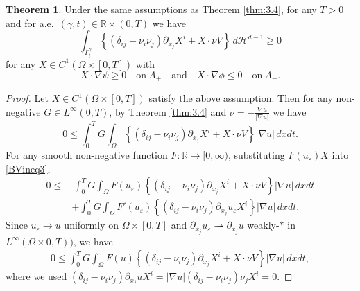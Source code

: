 \documentclass{amsart}
\theoremstyle{definition}
\newtheorem{theorem}[definition]{Theorem}
\def\R{{\mathbb{R}}}
\begin{document}
\begin{theorem}
Under the same assumptions as Theorem \ref{thm:3.4}, for any $T>0$ and for a.e.\ $(\gamma ,t) \in \R \times (0,T)$ we have 
\begin{equation}\label{BVineq2}
\int_{\Gamma _t ^\gamma}
\left\{
\left( \delta_{ij} - \nu_i \nu_j \right)
\partial_{x_j} X^i +
X \cdot \nu V 
\right\} \, d \mathcal{H}^{d-1}
\geq 0
\end{equation}
for any $X \in C^1 (\Omega \times [0,T])$ with
\[
X\cdot \nabla \psi \geq 0 \quad \text{on} \ A_+
\quad
\text{and}
\quad
X \cdot \nabla \phi \leq 0 \quad \text{on} \ A_-.
\]
\end{theorem}
\begin{proof}
Let $X \in C^1 (\Omega \times [0,T])$ 
satisfy the above assumption. 
Then for any non-negative $G \in L^\infty (0,T)$, 
by Theorem \ref{thm:3.4} 
and
$\nu= - \frac{\nabla u}{|\nabla u|}$ 
we have
\begin{equation}\label{BVineq3}
0\leq 
\int_0 ^T G
\int_{\Omega} \left\{ \left( \delta_{ij} - \nu_i \nu_j \right)
\partial_{x_j} X^i 
+ X \cdot \nu V
\right\} |\nabla u| \, dxdt.
\end{equation}
For any smooth non-negative function $F :\R\to [0,\infty)$, 
substituting $F (u_\varepsilon) X$ into \eqref{BVineq3}, 
\begin{equation}\label{BVineq4}
\begin{split}
0\leq & \, 
\int_0 ^T G
\int_{\Omega} F (u_\varepsilon) \left\{ \left( \delta_{ij} - \nu_i \nu_j \right)
\partial_{x_j} X^i 
+ X \cdot \nu V
\right\} |\nabla u| \, dxdt \\
&+
\int_0 ^T G
\int_{\Omega} F' (u_\varepsilon) \left\{ \left( \delta_{ij} - \nu_i \nu_j \right)
\partial_{x_j} u_\varepsilon X^i 
\right\} |\nabla u| \, dxdt.
\end{split}
\end{equation}
Since $u_\varepsilon \to u$ uniformly on $\Omega \times [0,T]$ and
$\partial _{x_j} u_\varepsilon \rightharpoonup \partial_{x_j} u$ weakly-$\ast$ in $L^\infty (\Omega \times 0,T))$, we have
\begin{equation}\label{BVineq5}
\begin{split}
0\leq  
\int_0 ^T G
\int_{\Omega} F (u) \left\{ \left( \delta_{ij} - \nu_i \nu_j \right)
\partial_{x_j} X^i 
+ X \cdot \nu V
\right\} |\nabla u| \, dxdt,
\end{split}
\end{equation}
where we used $(\delta_{ij} - \nu _i \nu_j)\partial _{x_j} u X^i
=|\nabla u| (\delta_{ij} -\nu_i\nu_j) \nu_j X^i=0$.

\end{proof}
\end{document}
